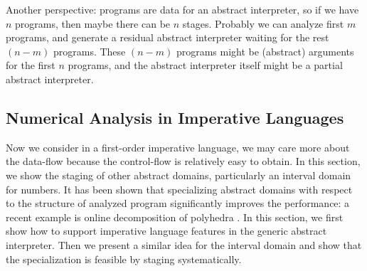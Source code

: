 \iffalse
\paragraph{Partially-Static Context} Under a polyvariant analysis (like
$k$-CFA), such summary generated by specializing static analyzer even could do
more for calling context by partially-static data optimization. For example,
consider that we have a library consists of three functions @f@, @g@ and @h@,
where @f@ calls @g@ and @h@ internally and returns @y@ fianlly (we extend the
language to have multiple arguments). @g@ and @h@ do not depend on @f@. Now we
would like to modularlly specialize these functions, starting from @f@ with an
initial environment containing @f@, @g@ and @h@.
\begin{lstlisting}
  def f(a, b, c) = val x = g(a, b); val y = h(x, c);  y
\end{lstlisting}

Since $k$ is bounded to a fixed number, after the analysis running $k$ steps
inside of @f@, the calling context will purely depend on the static structure of
our module being analyzed.
\fi


\iffalse
Another perspective: programs are data for an abstract interpreter, so if we
have $n$ programs, then maybe there can be $n$ stages. Probably we can analyze
first $m$ programs, and generate a residual abstract interpreter waiting for the
rest $(n-m)$ programs. These $(n-m)$ programs might be (abstract) arguments for
the first $n$ programs, and the abstract interpreter itself might be a partial
abstract interpreter.

\subsection{Numerical Analysis in Imperative Languages} \label{cases_imp}

Now we consider in a first-order imperative language, we may care more about the
data-flow because the control-flow is relatively easy to obtain. In this
section, we show the staging of other abstract domains, particularly an interval
domain for numbers. It has been shown that specializing abstract domains with
respect to the structure of analyzed program significantly improves the
performance: a recent example is online decomposition of polyhedra
\cite{DBLP:conf/popl/SinghPV17, Singh:2017:PCD:3177123.3158143}. In this
section, we first show how to support imperative language features in the
generic abstract interpreter. Then we present a similar idea for the interval
domain and show that the specialization is feasible by staging systematically.

